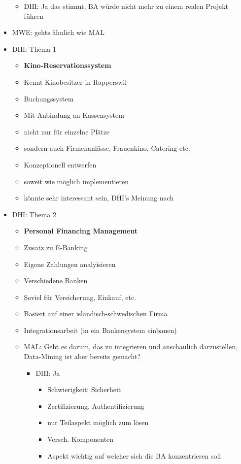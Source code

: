 \begin{itemize}
\begin{itemize}
		\item DHI: Ja das stimmt, BA würde nicht mehr zu einem realen Projekt führen
	\end{itemize}
	\item MWE: gehts ähnlich wie MAL
	\item DHI: Thema 1
	\begin{itemize}
		\item {\bf Kino-Reservationssystem}
		\item Kennt Kinobesitzer in Rapperswil
		\item Buchungssystem
		\item Mit Anbindung an Kassensystem
		\item nicht nur für einzelne Plätze
		\item sondern auch Firmenanlässe, Frauenkino, Catering etc.
		\item Konzeptionell entwerfen
		\item soweit wie möglich implementieren
		\item könnte sehr interessant sein, DHI's Meinung nach
	\end{itemize}
	\item DHI: Thema 2
	\begin{itemize}
		\item {\bf Personal Financing Management}
		\item Zusatz zu E-Banking
		\item Eigene Zahlungen analyisieren
		\item Verschiedene Banken
		\item Soviel für Versicherung, Einkauf, etc.
		\item Basiert auf einer isländisch-schwedischen Firma
		\item Integrationsarbeit (in ein Bankensystem einbauen)
		\item MAL: Geht es darum, das zu integrieren und anschaulich darzustellen, Data-Mining ist aber bereits gemacht?
		\begin{itemize}
			\item DHI: Ja
			\begin{itemize}
				\item Schwierigkeit: Sicherheit
				\item Zertifizierung, Authentifizierung
				\item nur Teilaspekt möglich zum lösen
				\item Versch. Komponenten
				\item Aspekt wichtig auf welcher sich die BA konzentrieren soll
			\end{itemize}

\end{itemize}
\end{itemize}
\end{itemize}
